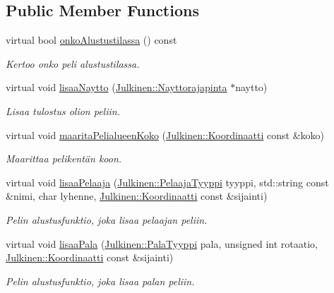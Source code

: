 \subsection*{Public Member Functions}
\begin{DoxyCompactItemize}
\item 
virtual bool \hyperlink{class_peli_a468618c1872582a68f85a5ef34defc19}{onko\+Alustustilassa} () const 
\begin{DoxyCompactList}\small\item\em Kertoo onko peli alustustilassa. \end{DoxyCompactList}\item 
virtual void \hyperlink{class_peli_a3fabca61c1c2707cb3810043bffa71c2}{lisaa\+Naytto} (\hyperlink{class_julkinen_1_1_nayttorajapinta}{Julkinen\+::\+Nayttorajapinta} $\ast$naytto)
\begin{DoxyCompactList}\small\item\em Lisaa tulostus olion peliin. \end{DoxyCompactList}\item 
virtual void \hyperlink{class_peli_adc8656a5e41df3c1343b2fa21495fbff}{maarita\+Pelialueen\+Koko} (\hyperlink{class_julkinen_1_1_koordinaatti}{Julkinen\+::\+Koordinaatti} const \&koko)
\begin{DoxyCompactList}\small\item\em Maarittaa pelikentän koon. \end{DoxyCompactList}\item 
virtual void \hyperlink{class_peli_a5061cb0a10052090128302e1619d1188}{lisaa\+Pelaaja} (\hyperlink{namespace_julkinen_ad9a0a9e01af78249f584a93b03db4329}{Julkinen\+::\+Pelaaja\+Tyyppi} tyyppi, std\+::string const \&nimi, char lyhenne, \hyperlink{class_julkinen_1_1_koordinaatti}{Julkinen\+::\+Koordinaatti} const \&sijainti)
\begin{DoxyCompactList}\small\item\em Pelin alustusfunktio, joka lisaa pelaajan peliin. \end{DoxyCompactList}\item 
virtual void \hyperlink{class_peli_a2d53bbe19ae97fe59ae37c05c72f4e51}{lisaa\+Pala} (\hyperlink{namespace_julkinen_a272c70e0503191a485c8a9cd4281e6f5}{Julkinen\+::\+Pala\+Tyyppi} pala, unsigned int rotaatio, \hyperlink{class_julkinen_1_1_koordinaatti}{Julkinen\+::\+Koordinaatti} const \&sijainti)
\begin{DoxyCompactList}\small\item\em Pelin alustusfunktio, joka lisaa palan peliin. \end{DoxyCompactList}\item 

\end{DoxyCompactItemize}
